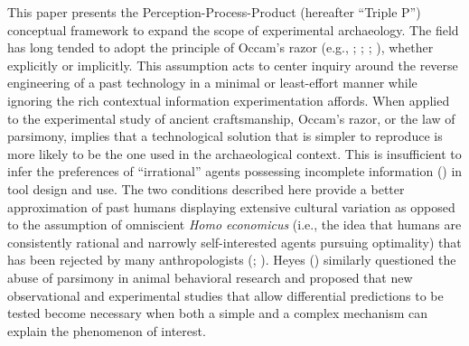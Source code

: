 \documentclass[
  11pt,
  letterpaper,
  DIV=11,
  numbers=noendperiod]{scrartcl}
\begin{document}
This paper presents the Perception-Process-Product (hereafter ``Triple
P'') conceptual framework to expand the scope of experimental
archaeology. The field has long tended to adopt the principle of Occam's
razor (e.g., ;
;
;
), whether explicitly
or implicitly. This assumption acts to center inquiry around the reverse
engineering of a past technology in a minimal or least-effort manner
while ignoring the rich contextual information experimentation affords.
When applied to the experimental study of ancient craftsmanship, Occam's
razor, or the law of parsimony, implies that a technological solution
that is simpler to reproduce is more likely to be the one used in the
archaeological context. This is insufficient to infer the preferences of
``irrational'' agents possessing incomplete information
() in tool
design and use. The two conditions described here provide a better
approximation of past humans displaying extensive cultural variation as
opposed to the assumption of omniscient \emph{Homo economicus} (i.e.,
the idea that humans are consistently rational and narrowly
self-interested agents pursuing optimality) that has been rejected by
many anthropologists (; ). Heyes () similarly
questioned the abuse of parsimony in animal behavioral research and
proposed that new observational and experimental studies that allow
differential predictions to be tested become necessary when both a
simple and a complex mechanism can explain the phenomenon of interest.
\end{document}
